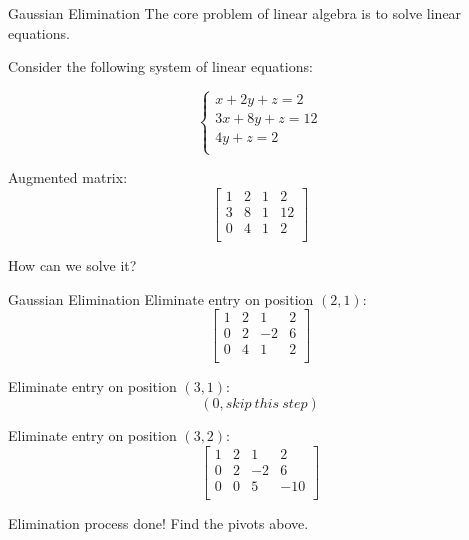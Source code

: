 \documentclass{beamer}
\begin{document}
\begin{frame}{Gaussian Elimination}
The core problem of linear algebra is to solve linear equations.

Consider the following system of linear equations:

\begin{equation*}
    \begin{cases}
        x+2y+z=2\\
        3x+8y+z=12\\
        4y+z=2\\
    \end{cases}
\end{equation*}

Augmented matrix:
\begin{equation*}
    \left[ \begin{matrix}
        1&		2&		1&		2\\
        3&		8&		1&		12\\
        0&		4&		1&		2\\
    \end{matrix} \right]
\end{equation*}

How can we solve it?
\end{frame}

\begin{frame}{Gaussian Elimination}
Eliminate entry on position $(2,1)$:
\begin{equation*}
    \left[ \begin{matrix}
        1&		2&		1&		2\\
        0&		2&		-2&		6\\
        0&		4&		1&		2\\
    \end{matrix} \right]
\end{equation*}

Eliminate entry on position $(3,1)$:
\begin{equation*}
    (0, skip \: this \: step)
\end{equation*}

Eliminate entry on position $(3,2)$:
\begin{equation*}
    \left[ \begin{matrix}
        1&		2&		1&		2\\
        0&		2&		-2&		6\\
        0&		0&		5&		-10\\
    \end{matrix} \right]
\end{equation*}

Elimination process done! Find the pivots above.
\end{frame}
\end{document}

